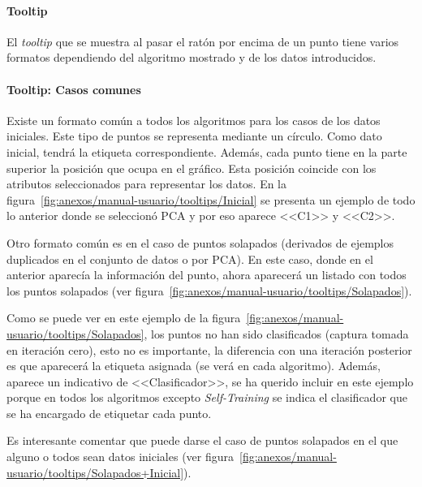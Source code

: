 \paragraph{Tooltip} El \textit{tooltip} que se muestra al pasar el ratón por
encima de un punto tiene varios formatos dependiendo del algoritmo mostrado y de
los datos introducidos.

\paragraph{Tooltip: Casos comunes} %

Existe un formato común a todos los algoritmos para los casos de los datos
iniciales. Este tipo de puntos se representa mediante un círculo. Como dato
inicial, tendrá la etiqueta correspondiente. Además, cada punto tiene en la
parte superior la posición que ocupa en el gráfico. Esta posición coincide con
los atributos seleccionados para representar los datos. En la
figura~\ref{fig:anexos/manual-usuario/tooltips/Inicial} se presenta un ejemplo
de todo lo anterior donde se seleccionó PCA y por eso aparece <<C1>> y <<C2>>.


Otro formato común es en el caso de puntos solapados (derivados de ejemplos
duplicados en el conjunto de datos o por PCA). En este caso, donde en el
anterior aparecía la información del punto, ahora aparecerá un listado con todos
los puntos solapados (ver
figura~\ref{fig:anexos/manual-usuario/tooltips/Solapados}).


Como se puede ver en este ejemplo de la
figura~\ref{fig:anexos/manual-usuario/tooltips/Solapados}, los puntos no han
sido clasificados (captura tomada en iteración cero), esto no es importante, la
diferencia con una iteración posterior es que aparecerá la etiqueta asignada (se
verá en cada algoritmo). Además, aparece un indicativo de <<Clasificador>>, se
ha querido incluir en este ejemplo porque en todos los algoritmos excepto
\textit{Self-Training} se indica el clasificador que se ha encargado de
etiquetar cada punto.

Es interesante comentar que puede darse el caso de puntos solapados en el que
alguno o todos sean datos iniciales (ver
figura~\ref{fig:anexos/manual-usuario/tooltips/Solapados+Inicial}).

